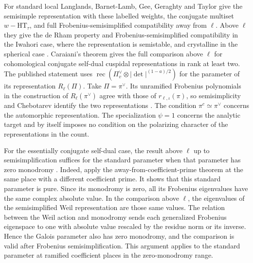 For standard local Langlands, Barnet-Lamb, Gee, Geraghty and Taylor
give the semisimple representation with these labelled weights,
the conjugate multiset \(w-\mathrm{HT}_\tau\), and full
Frobenius-semisimplified compatibility away from \(\ell\).
Above \(\ell\) they give the de Rham property and
Frobenius-semisimplified compatibility in the Iwahori case, where
the representation is semistable, and crystalline in the spherical
case \cite[Theorem~2.1.1]{f1-blggt-pacw}. Caraiani's theorem gives the
full comparison above \(\ell\) for cohomological conjugate self-dual
cuspidal representations in rank at least two. The published statement
uses \(\operatorname{rec}(\Pi_v^\vee\otimes|\det|^{(1-a)/2})\) for
the parameter of its representation \(R_\ell(\Pi)\).
Take \(\Pi=\pi^\vee\). Its unramified Frobenius polynomials in the
construction of \(R_\ell(\pi^\vee)\) agree with those of
\(r_{\ell,\iota}(\pi)\), so semisimplicity and Chebotarev identify
the two representations \cite[Theorem~1.1]{f1-caraiani-lp}.
The condition
\(\pi^c\simeq\pi^\vee\) concerns the automorphic representation.
The specialization \(\psi=1\) concerns the analytic target and by itself
imposes no condition on the polarizing character of the representations
in the count.

For the essentially conjugate self-dual case, the result above \(\ell\)
up to semisimplification suffices for the standard parameter when that
parameter has zero monodromy
\cite[Theorem~A]{f1-blggt-lp2}. Indeed, apply the away-from-coefficient-prime
theorem at the same place with a different coefficient prime.
It shows that this standard parameter is pure. Since its monodromy
is zero, all its Frobenius eigenvalues have the same complex absolute
value. In the comparison above \(\ell\), the eigenvalues of the
semisimplified Weil representation are those same values.
The relation between the Weil action and monodromy sends each
generalized Frobenius eigenspace to one with absolute value rescaled
by the residue norm or its inverse. Hence the Galois parameter
also has zero monodromy, and the comparison is valid after
Frobenius semisimplification. This argument applies to the
standard parameter at ramified coefficient places in the
zero-monodromy range.


